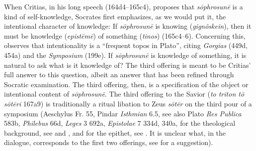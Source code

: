 When Critias, in his long speech (164d4–165c4), proposes that \emph{sōphrosunē} is a kind of self-knowledge, Socrates first emphasizes, as we would put it, the intentional character of knowledge: If \emph{sōphrosunē} is knowing (\emph{gignõskein}), then it must be knowledge (\emph{epistēmē}) of something (\emph{tinos}) (165c4–6). Concerning this, \citet[232]{Kosman:2014aa} observes that intentionality is a ``frequent topos in Plato'', citing \emph{Gorgias} (449d, 454a) and the \emph{Symposium} (199e). If \emph{sōphrosunē} is knowledge of something, it is natural to ask what is it knowledge of? The third offering is meant to be Critias' full answer to this question, albeit an answer that has been refined through Socratic examination. The third offering, then, is a specification of the object or intentional content of \emph{sōphrosunē}. The third offering to the Savior (\emph{to triton tō sōtēri} 167a9) is traditionally a ritual libation to Zeus \emph{sōtēr} on the third pour of a symposium (Aeschylus Fr. 55, Pindar \emph{Isthmian} 6.5, see also Plato \emph{Res Publica} 583b, \emph{Philebus} 66d, \emph{Leges} 3 692a, \emph{Epistolae} 7 334d, 340a, for the theological background, see \citealt{Cook:1914la} and  \citealt{Jim:2022ay}, and for the epithet, see \citealt{Rothrauff:1966nh}. It is unclear what, in the dialogue, corresponds to the first two offerings, see \citealt[23 n71]{Moore:2019aa} for a suggestion).


